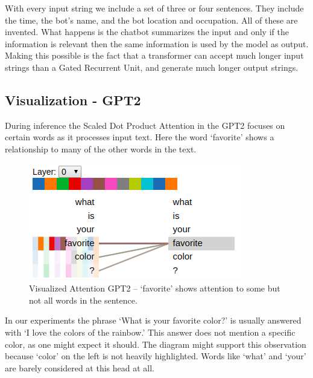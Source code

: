 With every input string we include a set of three or four sentences. They include the time, the bot's name, and the bot location and occupation. All of these are invented. What happens is the chatbot summarizes the input and only if the information is relevant then the same information is used by the model as output. Making this possible is the fact that a transformer can accept much longer input strings than a Gated Recurrent Unit, and generate much longer output strings.

\subsection*{Visualization - GPT2}

During inference the Scaled Dot Product Attention in the GPT2 focuses on certain words as it processes input text. Here the word `favorite' shows a relationship to many of the other words in the text.  

\begin{figure}[H]
	\begin{center}
		\includegraphics[scale=2]{Figure_4}
		
		
	\end{center}
	\caption[Visualized Attention GPT2]{Visualized Attention GPT2 -- `favorite' shows attention to some but not all words in the sentence.}
	
	
\end{figure}

In our experiments the phrase `What is your favorite color?' is usually answered with `I love the colors of the rainbow.' This answer does not mention a specific color, as one might expect it should. The diagram might support this observation because `color' on the left is not heavily highlighted. Words like `what' and `your' are barely considered at this head at all. 

